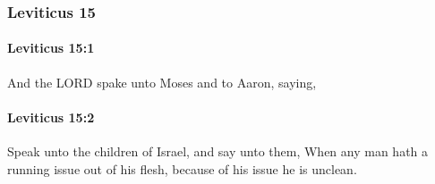 	\subsubsection{Leviticus 15} %
		\label{LEVITICUS-15}

		\paragraph{Leviticus 15:1} %
			\label{LEVITICUS-15-1}

			And the LORD spake unto Moses and to Aaron, saying,


		\paragraph{Leviticus 15:2} %
			\label{LEVITICUS-15-2}

			Speak unto the children of Israel, and say unto them, When any man hath a running issue out of his flesh, because of his issue he is unclean.

